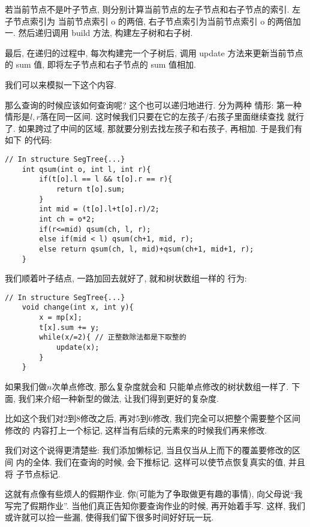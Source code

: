 若当前节点不是叶子节点, 则分别计算当前节点的左子节点和右子节点的索引. 左子节点索引为
当前节点索引 o 的两倍, 右子节点索引为当前节点索引 o 的两倍加一. 然后递归调用 
build 方法, 构建左子树和右子树. 

最后, 在递归的过程中, 每次构建完一个子树后, 调用 update 方法来更新当前节点的 sum 值, 即将左子节点和右子节点的 sum 值相加. 

我们可以来模拟一下这个内容. 

那么查询的时候应该如何查询呢? 这个也可以递归地进行. 分为两种
情形: 第一种情形是$l,r$落在同一区间. 这时候我们只要在它的左孩子/右孩子里面继续查找
就行了. 如果跨过了中间的区域, 那就要分别去找左孩子和右孩子, 再相加. 于是我们有如下
的代码: 

\begin{lstlisting}
// In structure SegTree{...} 
    int qsum(int o, int l, int r){
        if(t[o].l == l && t[o].r == r){
            return t[o].sum;
        }
        int mid = (t[o].l+t[o].r)/2;
        int ch = o*2; 
        if(r<=mid) qsum(ch, l, r);
        else if(mid < l) qsum(ch+1, mid, r);
        else return qsum(ch, l, mid)+qsum(ch+1, mid+1, r); 
    }
\end{lstlisting}

 我们顺着叶子结点, 一路加回去就好了, 就和树状数组一样的
行为: 

\begin{lstlisting}
// In structure SegTree{...} 
    void change(int x, int y){
		x = mp[x];
		t[x].sum += y;
		while(x/=2){ // 正整数除法都是下取整的
			update(x);
		}
	}
\end{lstlisting}

 如果我们做$n$次单点修改, 那么复杂度就会和
只能单点修改的树状数组一样了. 下面, 我们来介绍一种新型的做法, 
让我们得到更好的复杂度. 


比如这个我们对2到8修改之后, 再对5到6修改, 我们完全可以把整个需要整个区间修改的
内容打上一个标记, 这样当有后续的元素来的时候我们再来修改. 

我们对这个说得更清楚些: 我们添加懒标记, 当且仅当从上而下的覆盖要修改的区间
内的全体. 我们在查询的时候, 会下推标记. 这样可以使节点恢复真实的值, 并且将
子节点标记. 

这就有点像有些烦人的假期作业. 你(可能为了争取做更有趣的事情), 
向父母说``我写完了假期作业''. 
当他们真正告知你要查询作业的时候, 再开始着手写. 这样, 我们或许就可以捡一些漏, 
使得我们留下很多时间好好玩一玩. 

